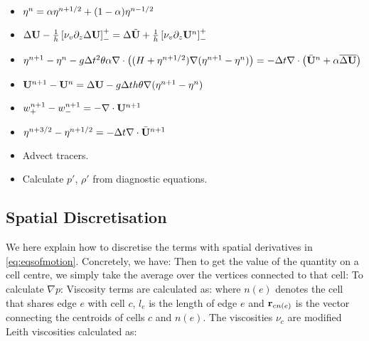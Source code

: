 \documentclass[10pt]{article}
\begin{document}
\begin{itemize}
	\item $ \eta^{n} = \alpha\eta^{n+1/2} + (1-\alpha)\eta^{n-1/2}$
	\item
$
	\Delta \mathbf{U} -  \frac{1}{h}\left[\nu_{v}\partial_{z}\Delta\mathbf{U}\right]^{+}_{-}= \Delta \tilde{\mathbf{U}}  + \frac{1}{h}\left[\nu_{v}\partial_{z}\mathbf{U}^{n}\right]^{+}_{-}
$
\item 
$
	\eta^{n+1} - \eta^{n} -g\Delta t^{2}\theta\alpha\nabla\cdot\left((H + \eta^{n+1/2})\nabla(\eta^{n+1} - \eta^{n})\right) = -\Delta t\nabla\cdot \left(\bar{\mathbf{U}}^{n} + \alpha\overline{\Delta\mathbf{U}}\right)
$
\item
$
	\mathbf{U}^{n+1} - \mathbf{U}^{n} = \Delta\mathbf{U} - g\Delta t h\theta\nabla(\eta^{n+1} - \eta^{n})
$
\item
$
	w_{+}^{n+1} - w_{-}^{n+1} = -\nabla\cdot\mathbf{U}^{n+1}
$
\item 
$
	\eta^{n+3/2} - \eta^{n+1/2} = -\Delta t \nabla\cdot \bar{\mathbf{U}}^{n+1}
$
\item Advect tracers.
\item Calculate $p'$, $\rho'$ from diagnostic equations.
\end{itemize}

\subsection{Spatial Discretisation}
We here explain how to discretise the terms with spatial derivatives in \cref{eq:eqsofmotion}. Concretely, we have:
Then to get the value of the quantity on a cell centre, we simply take the average over the vertices connected to that cell:
To calculate $\nabla p$:
 Viscosity terms are calculated as:
where $n(e)$ denotes the cell that shares edge $e$ with cell $c$, $l_{e}$ is the length of edge $e$ and $\mathbf{r}_{c n(e)}$ is the vector connecting the centroids of cells $c$ and $n(e)$. The viscosities $\nu_{c}$ are modified Leith viscosities calculated as:
\end{document}
